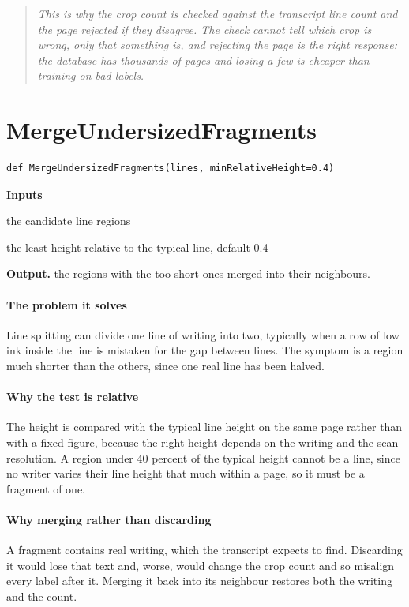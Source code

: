 \begin{quote}\small\itshape This is why the crop count is checked against the transcript line count and the page rejected if they disagree. The check cannot tell which crop is wrong, only that something is, and rejecting the page is the right response: the database has thousands of pages and losing a few is cheaper than training on bad labels.\end{quote}

\section{MergeUndersizedFragments}
\begin{lstlisting}[style=sig]
def MergeUndersizedFragments(lines, minRelativeHeight=0.4)
\end{lstlisting}

\noindent\textbf{Inputs}
\begin{description}[leftmargin=2.2em,style=nextline,font=\normalfont\ttfamily]\setlength\itemsep{1pt}
  \item[{lines}] \normalfont the candidate line regions
  \item[{minRelativeHeight}] \normalfont the least height relative to the typical line, default 0.4
\end{description}

\noindent\textbf{Output.} the regions with the too-short ones merged into their neighbours.


\paragraph{The problem it solves}
Line splitting can divide one line of writing into two, typically when a row of low ink inside the line is mistaken for the gap between lines. The symptom is a region much shorter than the others, since one real line has been halved.


\paragraph{Why the test is relative}
The height is compared with the typical line height on the same page rather than with a fixed figure, because the right height depends on the writing and the scan resolution. A region under 40 percent of the typical height cannot be a line, since no writer varies their line height that much within a page, so it must be a fragment of one.


\paragraph{Why merging rather than discarding}
A fragment contains real writing, which the transcript expects to find. Discarding it would lose that text and, worse, would change the crop count and so misalign every label after it. Merging it back into its neighbour restores both the writing and the count.


